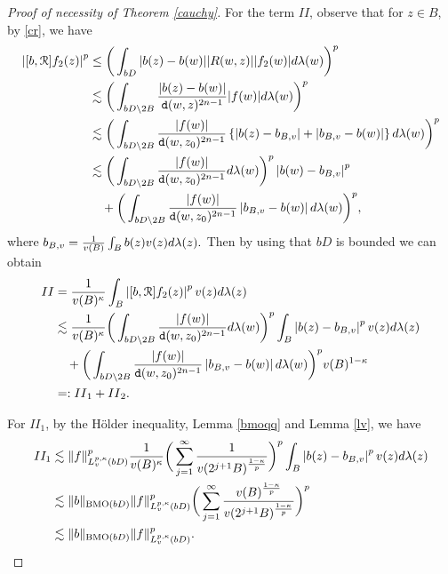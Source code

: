 \documentclass[11pt,a4paper]{amsart}
\numberwithin{equation}{section}
\begin{document}
{\begin{proof}[Proof of necessity of  Theorem \ref{cauchy}]
For the term $II$, observe that for $z\in B$, by \eqref {cr}, we have
\begin{align*}
\left|[b,\EuScript R] f_2(z)\right|^p
&\leq\bigg(\int_ {bD}|b(z)-b(w)| |R(w,z)| |f_2(w)|d\lambda(w)\bigg)^p\\
&\lesssim \bigg( \int_{ bD\setminus 2B}{|b(z)-b(w)|\over{\tt d}(w, z)^{2n-1}} |f(w)|d\lambda(w)\bigg)^p\\
&\lesssim \bigg(\int_{ bD\setminus 2B}{ |f(w)|\over{\tt d}(w, z_0)^{2n-1}}\left\{\left|b(z)-b_{B,v}\right|+\left|b_{B,v}-b(w)\right|\right\}d\lambda(w)\bigg)^p\\
&\lesssim\bigg(\int_{ bD\setminus 2B}{ |f(w)|\over{\tt d}(w, z_0)^{2n-1}}d\lambda(w)  \bigg)^p \left|b(w)-b_{B,v}\right|^p\\
&\quad+\bigg(\int_{ bD\setminus 2B}{ |f(w)|\over{\tt d}(w, z_0)^{2n-1}}\left|b_{B,v}-b(w)\right|d\lambda(w) \bigg)^p,
\end{align*}
where
$b_{B,v}={1\over v(B)}\int_{B}b(z)v(z)d\lambda(z).$ Then by using that $bD$ is bounded we can obtain
\begin{align*}
II&={1\over v(B)^\kappa}\int_B\left|[b,\EuScript R] f_2(z)\right|^pv(z)d\lambda(z)\\
&\lesssim
{1\over v(B)^\kappa} \bigg(\int_{bD\setminus 2B}{ |f(w)|\over{\tt d}(w, z_0)^{2n-1}}d\lambda(w) \bigg)^p\int_B\left|b(z)-b_{B,v}\right|^pv(z)d\lambda(z)  \\
&\quad+\bigg(\int_{ bD\setminus 2B}{ |f(w)|\over{\tt d}(w, z_0)^{2n-1}}\left|b_{B,v}-b(w)\right|d\lambda(w) \bigg)^pv(B)^{1-\kappa}\\
&=:{II}_1+{II}_2.
\end{align*}



For ${II}_1$, by the H\"older inequality, Lemma \ref{bmoqq} and Lemma \ref{lv}, we have
\begin{align*}
II_1&\lesssim \|f\|^p_{L_{v}^{p,\kappa}(bD)}{1\over v(B)^\kappa}\bigg(\sum_{j=1}^{\infty} {1\over v(2^{j+1}B)^{{1-\kappa\over p}}} \bigg)^p\int_B\left|b(z)-b_{B,v}\right|^pv(z)d\lambda(z)\\
&\lesssim\|b\|_{{\rm BMO}(bD)}\|f\|^p_{L_{v}^{p,\kappa}(bD)}\bigg(\sum_{j=1}^{\infty} {v(B)^{1-\kappa\over p}\over v(2^{j+1}B)^{{1-\kappa\over p}}} \bigg)^p\\
&\lesssim\|b\|_{{\rm BMO}(bD)}\|f\|^p_{L_{v}^{p,\kappa}(bD)}.
\end{align*}



\end{proof}}
\end{document}
